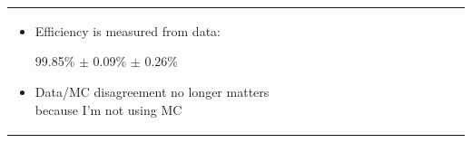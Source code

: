 \documentclass[landscape]{article}
\begin{document}
\begin{tabular}{p{0.6\linewidth} p{0.4\linewidth}}
\begin{minipage}{1.1\linewidth}
    \begin{itemize}

      \item Efficiency is measured from data:
\begin{center} 99.85\% $\pm$ 0.09\% $\pm$ 0.26\% \end{center}

\vspace{1 cm}
      \item Data/MC disagreement no longer matters because I'm
      not using MC

    \end{itemize}

  \end{minipage} \\
\end{tabular}
\end{document}

